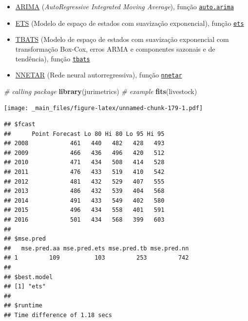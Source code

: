 \documentclass[
]{book}
\newenvironment{Shaded}{\begin{snugshade}}{\end{snugshade}}
\newcommand{\CommentTok}[1]{\textcolor[rgb]{0.56,0.35,0.01}{\textit{#1}}}
\newcommand{\KeywordTok}[1]{\textcolor[rgb]{0.13,0.29,0.53}{\textbf{#1}}}
\newcommand{\NormalTok}[1]{#1}
\providecommand{\tightlist}{%
  \setlength{\itemsep}{0pt}\setlength{\parskip}{0pt}}
\theoremstyle{definition}
\theoremstyle{definition}
\theoremstyle{definition}
\theoremstyle{remark}
\begin{document}
\begin{itemize}
\tightlist
\item
  \href{https://otexts.com/fpp2/arima.html}{ARIMA} (\emph{AutoRegressive Integrated Moving Average}), função \href{https://www.rdocumentation.org/packages/forecast/versions/8.7/topics/auto.arima}{\texttt{auto.arima}}\\
\item
  \href{https://otexts.com/fpp2/ets.html}{ETS} (Modelo de espaço de estados com suavização exponencial), função \href{https://www.rdocumentation.org/packages/forecast/versions/8.7/topics/ets}{\texttt{ets}}\\
\item
  \href{https://otexts.com/fpp2/complexseasonality.html}{TBATS} (Modelo de espaço de estados com suavização exponencial com transformação Box-Cox, erros ARMA e componentes sazonais e de tendência), função \href{https://www.rdocumentation.org/packages/forecast/versions/8.7/topics/tbats}{\texttt{tbats}}\\
\item
  \href{https://otexts.com/fpp2/nnetar.html}{NNETAR} (Rede neural autorregressiva), função \href{https://www.rdocumentation.org/packages/forecast/versions/8.7/topics/nnetar}{\texttt{nnetar}}
\end{itemize}

\begin{Shaded}
\begin{Highlighting}[]
\CommentTok{\# calling package}
\KeywordTok{library}\NormalTok{(jurimetrics)}
\CommentTok{\# example}
\KeywordTok{fits}\NormalTok{(livestock)}
\end{Highlighting}
\end{Shaded}

\texttt{[image: \_main\_files/figure-latex/unnamed-chunk-179-1.pdf]}

\begin{verbatim}
## $fcast
##      Point Forecast Lo 80 Hi 80 Lo 95 Hi 95
## 2008            461   440   482   428   493
## 2009            466   436   496   420   512
## 2010            471   434   508   414   528
## 2011            476   433   519   410   542
## 2012            481   432   529   407   555
## 2013            486   432   539   404   568
## 2014            491   433   549   402   580
## 2015            496   434   558   401   591
## 2016            501   434   568   399   603
## 
## $mse.pred
##   mse.pred.aa mse.pred.ets mse.pred.tb mse.pred.nn
## 1         109          103         253         742
## 
## $best.model
## [1] "ets"
## 
## $runtime
## Time difference of 1.18 secs
\end{verbatim}
\end{document}
